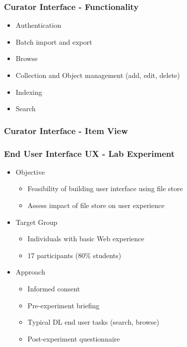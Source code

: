 \documentclass[xcolor=dvitex,t,11pt]{beamer}
\begin{document}
\begin{frame}[fragile]
\frametitle{Curator Interface - Functionality}
\begin{figure}
\centering
\framebox[\textwidth]{%

}
\end{figure}
\begin{itemize}
\item Authentication
\item Batch import and export
\item Browse
\item Collection and Object management (add, edit, delete)
\item Indexing
\item Search
\end{itemize}
\end{frame}

\begin{frame}[fragile]
\frametitle{Curator Interface - Item View}
\begin{figure}
\centering
{}
\end{figure}
\end{frame}

\begin{frame}[fragile]
\frametitle{End User Interface UX - Lab Experiment}
\begin{itemize}
\item Objective
\begin{itemize}
\item Feasibility of building user interface using file store
\item Assess impact of file store on user experience
\end{itemize}
\item Target Group
\begin{itemize}
\item Individuals with basic Web experience
\item 17 participants (80\% students)
\end{itemize}
\item Approach
\begin{itemize}
\item Informed consent
\item Pre-experiment briefing
\item Typical DL end user tasks (search, browse)
\item Post-experiment questionnaire
\end{itemize}
\end{itemize}
\end{frame}
\end{document}
